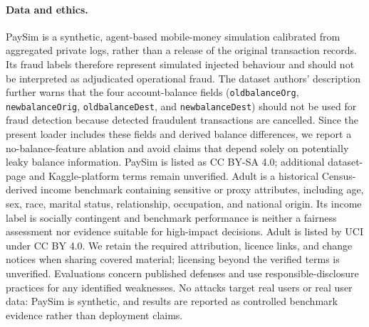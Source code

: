 \paragraph{Data and ethics.}
PaySim is a synthetic, agent-based mobile-money simulation calibrated from aggregated private logs, rather than a release of the original transaction records.  Its fraud labels therefore represent simulated injected behaviour and should not be interpreted as adjudicated operational fraud.  The dataset authors' description further warns that the four account-balance fields (\texttt{oldbalanceOrg}, \texttt{newbalanceOrig}, \texttt{oldbalanceDest}, and \texttt{newbalanceDest}) should not be used for fraud detection because detected fraudulent transactions are cancelled.  Since the present loader includes these fields and derived balance differences, we report a no-balance-feature ablation and avoid claims that depend solely on potentially leaky balance information.  PaySim is listed as CC BY-SA 4.0; additional dataset-page and Kaggle-platform terms remain unverified.  Adult is a historical Census-derived income benchmark containing sensitive or proxy attributes, including age, sex, race, marital status, relationship, occupation, and national origin.  Its income label is socially contingent and benchmark performance is neither a fairness assessment nor evidence suitable for high-impact decisions.  Adult is listed by UCI under CC BY 4.0.  We retain the required attribution, licence links, and change notices when sharing covered material; licensing beyond the verified terms is unverified.  Evaluations concern published defenses and use responsible-disclosure practices for any identified weaknesses.  No attacks target real users or real user data: PaySim is synthetic, and results are reported as controlled benchmark evidence rather than deployment claims.
